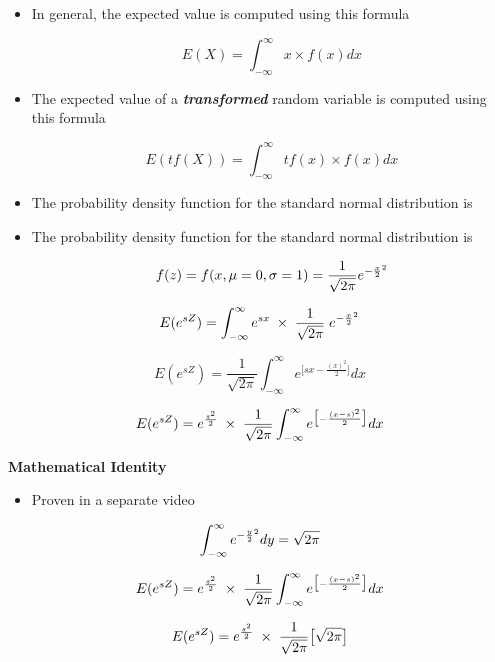 \documentclass[00-IntroStatsMaster.tex]{subfiles}
\begin{document}
	
	\begin{itemize}
		\item In general, the expected value is computed using this formula
		{
			
			\[ E(X) =  \int_{-\infty}^{\infty}  x \times f(x) dx   \]
		}
		\item The expected value of a \textbf{\textit{transformed}} random variable is computed using this formula
		{
			
			\[ E( tf(X) ) =  \int_{-\infty}^{\infty}  tf(x) \times f(x) dx   \]
		}
		
		\item 
		The probability density function for the standard normal distribution is
		
		
		\item 
		The probability density function for the standard normal distribution is
		
		
		\[f(z) = f(x, \mu= 0, \sigma=1) = \frac{1}{\sqrt{2\pi}} e^{ -{x \over 2}^2 }\]
		
	\end{itemize}
	
	
	
	
	{
		
		\[ E( e^{sZ} ) =  \int_{-\infty}^{\infty}  e^{sx} \;\times\; \frac{1}{\sqrt{2\pi}} \;e^{ -{x \over 2}^2 }\]
		
		
		\[ E( e^{sZ} ) =  \frac{1}{\sqrt{2\pi}} \int_{-\infty}^{\infty}   e^{ \big[sx-\frac{(x)^2}{2} \big]} dx   \]
		
		\[ E( e^{sZ} ) =  e^{{s^2\over 2}} \; \times\; \frac{1}{\sqrt{2\pi}} \int_{-\infty}^{\infty} e^{ \big[-\frac{(x-s)^2}{2} \big]} dx   \]
	}
	
	
	
	\textbf{Mathematical Identity}
	\begin{itemize}
		\item Proven in a separate video
	\end{itemize}
	{
		
		\[\int_{-\infty}^{\infty} e^{-{y\over 2}^2}dy  = \sqrt{2\pi}\]
		
	}
	
	
	
	
	{
		
		\[ E( e^{sZ} ) =  e^{{s^2\over 2}} \; \times\; \frac{1}{\sqrt{2\pi}} \int_{-\infty}^{\infty} e^{ \big[-\frac{(x-s)^2}{2} \big]} dx \]
		
		
		\[ E( e^{sZ} ) =  e^{{s^2\over 2}} \; \times\; \frac{1}{\sqrt{2\pi}} \big[\sqrt{2\pi} \big] \]
	}
	
	
\end{document}
